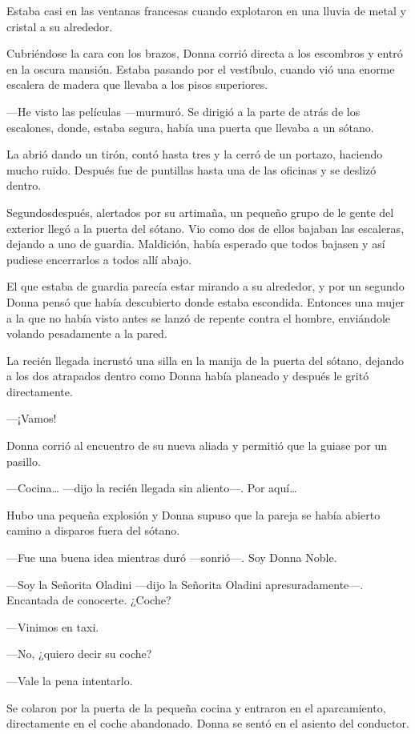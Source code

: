 Estaba casi en las ventanas francesas cuando explotaron en una
lluvia de metal y cristal a su alrededor.

Cubriéndose la cara con los brazos, Donna corrió directa a los
escombros y entró en la oscura mansión. Estaba pasando por el vestíbulo,
cuando vió una enorme escalera de madera que llevaba a los pisos
superiores.

---He visto las películas ---murmuró. Se dirigió a la parte de
atrás de los escalones, donde, estaba segura, había una puerta que
llevaba a un sótano.

La abrió dando un tirón, contó hasta tres y la cerró de un
portazo, haciendo mucho ruido. Después fue de puntillas hasta una de las
oficinas y se deslizó dentro.

Segundosdespués, alertados por su artimaña, un pequeño grupo
de le gente del exterior llegó a la puerta del sótano. Vio como dos de
ellos bajaban las escaleras, dejando a uno de guardia. Maldición, había
esperado que todos bajasen y así pudiese encerrarlos a todos allí abajo.

El que estaba de guardia parecía estar mirando a su alrededor, y por un
segundo Donna pensó que había descubierto donde estaba escondida.
Entonces una mujer a la que no había visto antes se lanzó de repente
contra el hombre, enviándole volando pesadamente a la pared.

La recién llegada incrustó una silla en la manija de la puerta
del sótano, dejando a los dos atrapados dentro como Donna había planeado
y después le gritó directamente.

---¡Vamos!

Donna corrió al encuentro de su nueva aliada y permitió que la
guiase por un pasillo.

---Cocina\ldots{} ---dijo la recién llegada sin aliento---. Por
aquí\ldots{}

Hubo una pequeña explosión y Donna supuso que la pareja se había
abierto camino a disparos fuera del sótano.

---Fue una buena idea mientras duró ---sonrió---. Soy Donna Noble.

---Soy la Señorita Oladini ---dijo la Señorita Oladini
apresuradamente---. Encantada de conocerte. ¿Coche?

---Vinimos en taxi.

---No, ¿quiero decir su coche?

---Vale la pena intentarlo.

Se colaron por la puerta de la pequeña cocina y entraron en el
aparcamiento, directamente en el coche abandonado. Donna se sentó en el
asiento del conductor.

